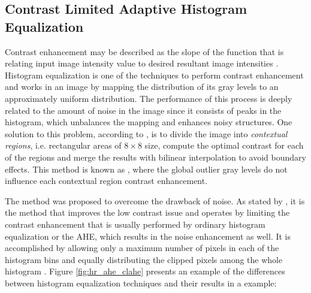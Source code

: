 \subsection{Contrast Limited Adaptive Histogram Equalization}

Contrast enhancement may be described as the slope of the function that is relating input image intensity value to desired resultant image intensities \cite{sonali2019approach}. Histogram equalization is one of the techniques to perform contrast enhancement and works in an image by mapping the distribution of its gray levels to an approximately uniform distribution. The performance of this process is deeply related to the amount of noise in the image since it consists of peaks in the histogram, which unbalances the mapping and enhances noisy structures. One solution to this problem, according to , is to divide the image into \emph{contextual regions}, i.e. rectangular areas of $8 \times 8$ size, compute the optimal contrast for each of the regions and merge the results with bilinear interpolation to avoid boundary effects. This method is known as , where the global outlier gray levels do not influence each contextual region contrast enhancement.

The  method was proposed to overcome the drawback of noise. As stated by , it is the method that improves the low contrast issue and operates by limiting the contrast enhancement that is usually performed by ordinary histogram equalization or the AHE, which results in the noise enhancement as well. It is accomplished by allowing only a maximum number of pixels in each of the histogram bins and equally distributing the clipped pixels among the whole histogram \cite{zuiderveld1994constrast}. Figure \ref{fig:hr_ahe_clahe} presents an example of the differences between histogram equalization techniques and their results in a  example:

